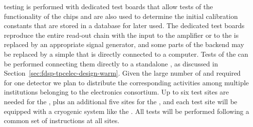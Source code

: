  testing is performed with dedicated test boards that
allow tests of the functionality of the chips and are also used
to determine the initial calibration constants that are stored in
a database for later used. The dedicated test boards reproduce the
entire read-out chain with the input to the  amplifier
or to the  is replaced by an appropriate signal generator,
and some parts of the backend may be replaced by a simple 
that is directly connected to a computer. Tests of the 
can be performed connecting them directly to a standalone ,
as discussed in Section~\ref{sec:fdsp-tpcelec-design-warm}. Given
the large number of  and  required for
one   detector we plan to distribute the 
corresponding  activities among multiple institutions
belonging to the  electronics consortium. Up to six
test sites are needed for the , plus an additional
five sites for the , and each test site will be 
equipped with a cryogenic system like the . All tests
will be performed following a common set of instructions
at all sites. 

